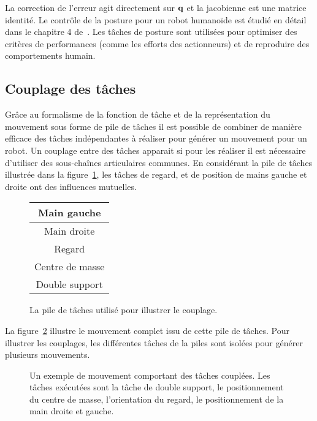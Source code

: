 La correction de l'erreur agit directement sur ${\mathbf{q}}$ et la jacobienne est une matrice identité.
Le contrôle de la posture pour un robot humanoïde est 
étudié en détail dans le chapitre 4 de~\cite{sentis07}. Les t\^aches de posture
sont utilisées pour optimiser des critères de performances (comme les efforts des actionneurs)
et de reproduire des comportements humain.

\subsection{Couplage des t\^aches}
Gr\^ace au formalisme de la fonction de t\^ache
et de la représentation du mouvement sous forme
de pile de t\^aches il est possible de combiner 
de manière efficace des t\^aches indépendantes à réaliser
pour générer un mouvement pour un robot.
Un couplage entre des t\^aches apparait si pour les réaliser il est nécessaire
d'utiliser des sous-chaînes articulaires communes.
En considérant la pile de t\^aches illustrée dans la figure~\ref{fig:couplingSot},
les t\^aches de regard, et de position de mains gauche et droite  ont des
influences mutuelles.
\begin{figure}[t]
  \begin{center}
    \begin{tabular}{|c|}
      \hline
      Main gauche\\
      \hline
      Main droite\\
      \hline
      Regard\\
      \hline
      Centre de masse\\
      \hline
      Double support\\
      \hline
    \end{tabular}
  \end{center}
  \caption{La pile de t\^aches utilisé pour illustrer le couplage.}
  \label{fig:couplingSot}
\end{figure}

La figure~\ref{fig:fullSot} illustre le mouvement
complet issu de cette pile de t\^aches. Pour illustrer les 
couplages, les différentes t\^aches de la piles sont
isolées pour générer plusieurs mouvements. 
\begin{figure}[t]
  \begin{center}
  \end{center}
  \caption[Exemple de t\^aches couplées dans un mouvement.]{Un exemple de mouvement comportant des t\^aches couplées. Les t\^aches
  exécutées sont la t\^ache de double support, le positionnement du centre de masse,
  l'orientation du regard, le positionnement de la main droite et gauche.}
  \label{fig:fullSot}
\end{figure}

